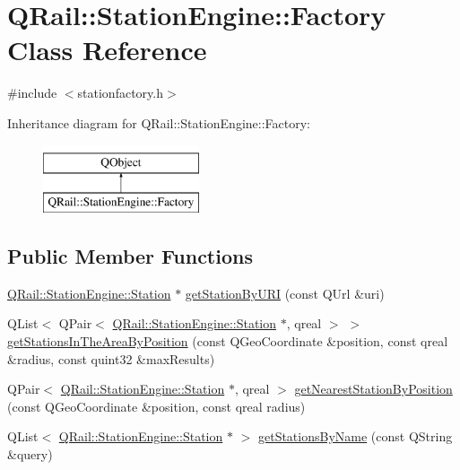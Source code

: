 \hypertarget{classQRail_1_1StationEngine_1_1Factory}{}\section{Q\+Rail\+::Station\+Engine\+::Factory Class Reference}
\label{classQRail_1_1StationEngine_1_1Factory}


{\ttfamily \#include $<$stationfactory.\+h$>$}

Inheritance diagram for Q\+Rail\+::Station\+Engine\+::Factory\+:\begin{figure}[H]
\begin{center}
\leavevmode
\includegraphics[height=2.000000cm]{classQRail_1_1StationEngine_1_1Factory}
\end{center}
\end{figure}
\subsection*{Public Member Functions}
\begin{DoxyCompactItemize}
\item 
\mbox{\hyperlink{classQRail_1_1StationEngine_1_1Station}{Q\+Rail\+::\+Station\+Engine\+::\+Station}} $\ast$ \mbox{\hyperlink{classQRail_1_1StationEngine_1_1Factory_ad7b0c3ee3716d2a99643c0c7b0b9a9c0}{get\+Station\+By\+U\+RI}} (const Q\+Url \&uri)
\item 
Q\+List$<$ Q\+Pair$<$ \mbox{\hyperlink{classQRail_1_1StationEngine_1_1Station}{Q\+Rail\+::\+Station\+Engine\+::\+Station}} $\ast$, qreal $>$ $>$ \mbox{\hyperlink{classQRail_1_1StationEngine_1_1Factory_aa01df9c015321d15605192969d7d363e}{get\+Stations\+In\+The\+Area\+By\+Position}} (const Q\+Geo\+Coordinate \&position, const qreal \&radius, const quint32 \&max\+Results)
\item 
Q\+Pair$<$ \mbox{\hyperlink{classQRail_1_1StationEngine_1_1Station}{Q\+Rail\+::\+Station\+Engine\+::\+Station}} $\ast$, qreal $>$ \mbox{\hyperlink{classQRail_1_1StationEngine_1_1Factory_a385cbfbc2697c39bd2c09b866bdfd4ac}{get\+Nearest\+Station\+By\+Position}} (const Q\+Geo\+Coordinate \&position, const qreal radius)
\item 
Q\+List$<$ \mbox{\hyperlink{classQRail_1_1StationEngine_1_1Station}{Q\+Rail\+::\+Station\+Engine\+::\+Station}} $\ast$ $>$ \mbox{\hyperlink{classQRail_1_1StationEngine_1_1Factory_a892a259deeb2911edda868a09549b68a}{get\+Stations\+By\+Name}} (const Q\+String \&query)
\end{DoxyCompactItemize}
